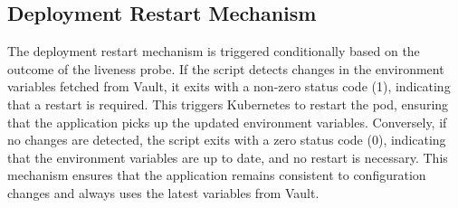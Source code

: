 \subsection{Deployment Restart Mechanism}

The deployment restart mechanism is triggered conditionally based on the outcome of the liveness probe. If the script detects changes in the environment variables fetched from Vault, it exits with a non-zero status code (1), indicating that a restart is required. This triggers Kubernetes to restart the pod, ensuring that the application picks up the updated environment variables. Conversely, if no changes are detected, the script exits with a zero status code (0), indicating that the environment variables are up to date, and no restart is necessary. This mechanism ensures that the application remains consistent to configuration changes and always uses the latest variables from Vault.
